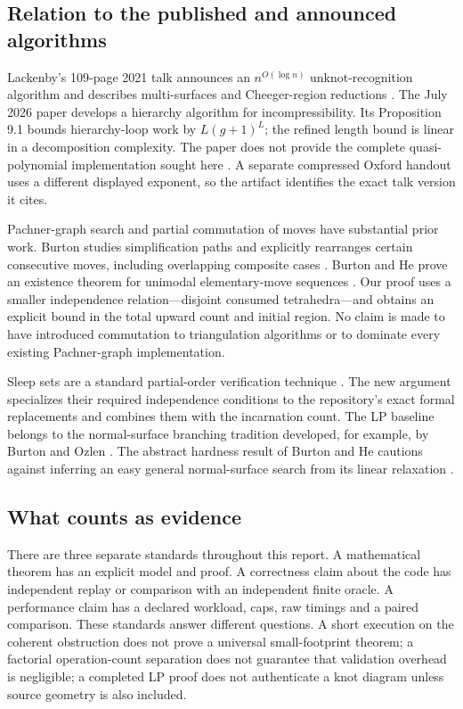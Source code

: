 \subsection{Relation to the published and announced algorithms}

Lackenby's 109-page 2021 talk announces an $n^{O(\log n)}$ unknot-recognition
algorithm and describes multi-surfaces and Cheeger-region reductions
\cite{LackenbyTalk}. The July 2026 paper develops a hierarchy algorithm for
incompressibility. Its Proposition 9.1 bounds hierarchy-loop work by
$L(g+1)^L$; the refined length bound is linear in a decomposition complexity.
The paper does not provide the complete quasi-polynomial implementation sought
here \cite{Lackenby2026}. A separate compressed Oxford handout uses a different
displayed exponent, so the artifact identifies the exact talk version it cites.

Pachner-graph search and partial commutation of moves have substantial prior
work. Burton studies simplification paths and explicitly rearranges certain
consecutive moves, including overlapping composite cases
\cite{BurtonPachner}. Burton and He prove an existence theorem for unimodal
elementary-move sequences \cite{BurtonHeMoves}. Our proof uses a smaller
independence relation---disjoint consumed tetrahedra---and obtains an explicit
bound in the total upward count and initial region. No claim is made to have
introduced commutation to triangulation algorithms or to dominate every
existing Pachner-graph implementation.

Sleep sets are a standard partial-order verification technique
\cite{Godefroid}. The new argument specializes their required independence
conditions to the repository's exact formal replacements and combines them
with the incarnation count. The LP baseline belongs to the normal-surface
branching tradition developed, for example, by Burton and Ozlen
\cite{BurtonOzlen}. The abstract hardness result of Burton and He cautions
against inferring an easy general normal-surface search from its linear
relaxation \cite{BurtonHeHardness}.

\subsection{What counts as evidence}

There are three separate standards throughout this report. A mathematical
theorem has an explicit model and proof. A correctness claim about the code
has independent replay or comparison with an independent finite oracle.
A performance claim has a declared workload, caps, raw timings and a paired
comparison. These standards answer different questions. A short execution on
the coherent obstruction does not prove a universal small-footprint theorem;
a factorial operation-count separation does not guarantee that validation
overhead is negligible; a completed LP proof does not authenticate a knot
diagram unless source geometry is also included.
